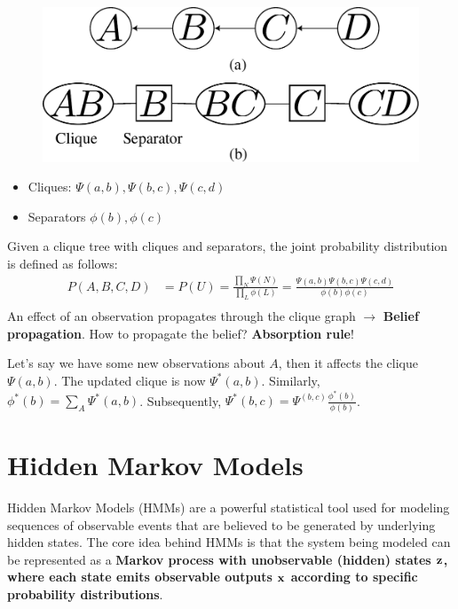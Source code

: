 \begin{figure}[h]
	\centering
	\includegraphics[scale=0.5]{./images/hmm/cascade.pdf}
\end{figure}

\begin{itemize}
	\item Cliques: $\Psi(a,b), \Psi(b,c), \Psi(c,d)$
	\item Separators $\phi(b), \phi(c)$
\end{itemize}
Given a clique tree with cliques and separators, the joint probability distribution is defined as follows:
\begin{align*}
	P(A,B,C,D) &= P(U) = \frac{\prod_N \Psi(N)}{\prod_L\phi(L)}= \frac{ \Psi(a,b)\Psi(b,c)\Psi(c,d)}{\phi(b)\phi(c)}\\
\end{align*}
An effect of an observation propagates through the clique graph $\to$ \textbf{Belief propagation}. How to propagate the belief? \textbf{Absorption rule}!

Let's say we have some new observations about $A$, then it affects the clique $\Psi(a,b)$. The updated clique is now $\Psi^*(a,b)$. Similarly, $\phi^*(b) = \sum_A\Psi^*(a,b)$. Subsequently, $\Psi^*(b,c) = \Psi^(b,c)\frac{\phi^*(b)}{\phi(b)}$.

\section{Hidden Markov Models}
\label{sec:hmm}
Hidden Markov Models (HMMs) are a powerful statistical tool used for modeling sequences of observable events that are believed to be generated by underlying hidden states. The core idea behind HMMs is that the system being modeled can be represented as a \textbf{Markov process with unobservable (hidden) states ${\mathbf{z}}$, where each state emits observable outputs ${\mathbf{x}}$ according to specific probability distributions}.

